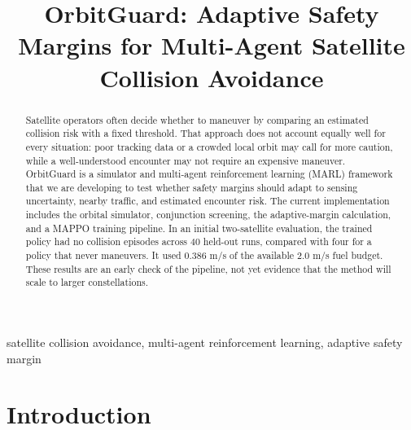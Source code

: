 \documentclass[conference]{IEEEtran}
\begin{document}
\title{OrbitGuard: Adaptive Safety Margins for Multi-Agent Satellite Collision Avoidance}

\author{
}

\maketitle

\begin{abstract}
Satellite operators often decide whether to maneuver by comparing an estimated collision risk with a fixed threshold. That approach does not account equally well for every situation: poor tracking data or a crowded local orbit may call for more caution, while a well-understood encounter may not require an expensive maneuver. OrbitGuard is a simulator and multi-agent reinforcement learning (MARL) framework that we are developing to test whether safety margins should adapt to sensing uncertainty, nearby traffic, and estimated encounter risk. The current implementation includes the orbital simulator, conjunction screening, the adaptive-margin calculation, and a MAPPO training pipeline. In an initial two-satellite evaluation, the trained policy had no collision episodes across 40 held-out runs, compared with four for a policy that never maneuvers. It used 0.386 m/s of the available 2.0 m/s fuel budget. These results are an early check of the pipeline, not yet evidence that the method will scale to larger constellations.
\end{abstract}

\begin{IEEEkeywords}
satellite collision avoidance, multi-agent reinforcement learning, adaptive safety margin
\end{IEEEkeywords}

\section{Introduction}
\end{document}
